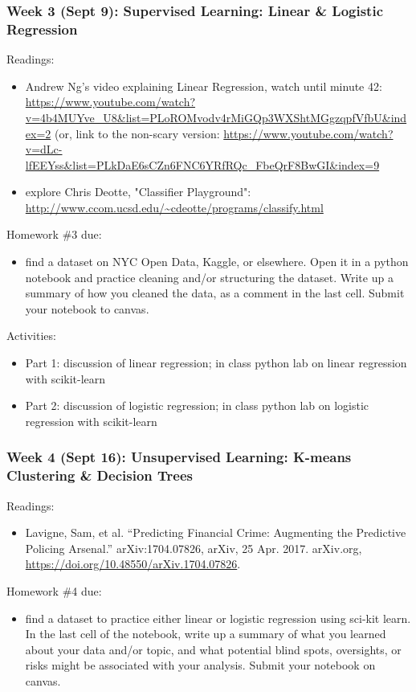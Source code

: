 \documentclass[12pt]{article}
\begin{document}
\subsubsection*{Week 3 (Sept 9): Supervised Learning: Linear \& Logistic Regression}
\label{sec:org274ee24}
Readings:
\begin{itemize}
\item Andrew Ng's video explaining Linear Regression, watch until minute
42:
\url{https://www.youtube.com/watch?v=4b4MUYve\_U8\&list=PLoROMvodv4rMiGQp3WXShtMGgzqpfVfbU\&index=2}
(or, link to the non-scary version:
\url{https://www.youtube.com/watch?v=dLc-lfEEYss\&list=PLkDaE6sCZn6FNC6YRfRQc\_FbeQrF8BwGI\&index=9}
\item explore Chris Deotte, "Classifier Playground":
\url{http://www.ccom.ucsd.edu/\~cdeotte/programs/classify.html}
\end{itemize}

Homework \#3 due:
\begin{itemize}
\item find a dataset on NYC Open Data, Kaggle, or elsewhere. Open it in a
python notebook and practice cleaning and/or structuring the
dataset. Write up a summary of how you cleaned the data, as a
comment in the last cell. Submit your notebook to canvas.
\end{itemize}

Activities:
\begin{itemize}
\item Part 1: discussion of linear regression; in class python lab on
linear regression with scikit-learn
\item Part 2: discussion of logistic regression; in class python lab on
logistic regression with scikit-learn
\end{itemize}

\subsubsection*{Week 4 (Sept 16): Unsupervised Learning: K-means Clustering \& Decision Trees}
\label{sec:orga4b1fed}
Readings:
\begin{itemize}
\item Lavigne, Sam, et al. “Predicting Financial Crime: Augmenting the
Predictive Policing Arsenal.” arXiv:1704.07826, arXiv, 25 Apr. 2017.
arXiv.org, \url{https://doi.org/10.48550/arXiv.1704.07826}.
\end{itemize}

Homework \#4 due:
\begin{itemize}
\item find a dataset to practice either linear or logistic regression
using sci-kit learn. In the last cell of the notebook, write up a
summary of what you learned about your data and/or topic, and what
potential blind spots, oversights, or risks might be associated with
your analysis. Submit your notebook on canvas.
\end{itemize}
\end{document}
